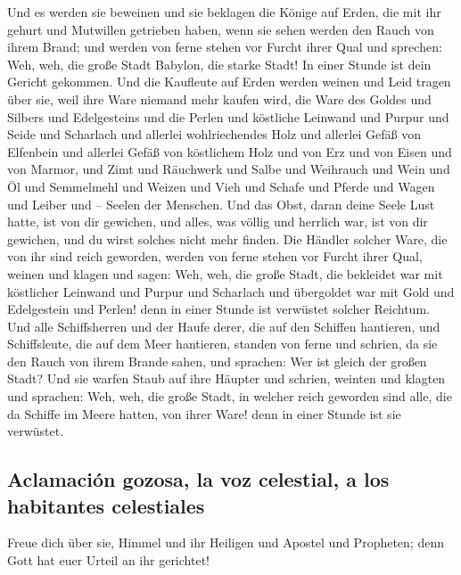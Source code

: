  Und es werden sie beweinen und sie beklagen die Könige
auf Erden, die mit ihr gehurt und Mutwillen getrieben haben, wenn sie
sehen werden den Rauch von ihrem Brand;  und werden von
ferne stehen vor Furcht ihrer Qual und sprechen: Weh, weh, die große
Stadt Babylon, die starke Stadt! In einer Stunde ist dein Gericht
gekommen.  Und die Kaufleute auf Erden werden weinen und
Leid tragen über sie, weil ihre Ware niemand mehr kaufen wird,
 die Ware des Goldes und Silbers und Edelgesteins und die
Perlen und köstliche Leinwand und Purpur und Seide und Scharlach und
allerlei wohlriechendes Holz und allerlei Gefäß von Elfenbein und
allerlei Gefäß von köstlichem Holz und von Erz und von Eisen und von
Marmor,  und Zimt und Räuchwerk und Salbe und Weihrauch
und Wein und Öl und Semmelmehl und Weizen und Vieh und Schafe und Pferde
und Wagen und Leiber und -- Seelen der Menschen.  Und das
Obst, daran deine Seele Lust hatte, ist von dir gewichen, und alles, was
völlig und herrlich war, ist von dir gewichen, und du wirst solches
nicht mehr finden.  Die Händler solcher Ware, die von ihr
sind reich geworden, werden von ferne stehen vor Furcht ihrer Qual,
weinen und klagen  und sagen: Weh, weh, die große Stadt,
die bekleidet war mit köstlicher Leinwand und Purpur und Scharlach und
übergoldet war mit Gold und Edelgestein und Perlen!  denn
in einer Stunde ist verwüstet solcher Reichtum. Und alle Schiffsherren
und der Haufe derer, die auf den Schiffen hantieren, und Schiffsleute,
die auf dem Meer hantieren, standen von ferne  und
schrien, da sie den Rauch von ihrem Brande sahen, und sprachen: Wer ist
gleich der großen Stadt?  Und sie warfen Staub auf ihre
Häupter und schrien, weinten und klagten und sprachen: Weh, weh, die
große Stadt, in welcher reich geworden sind alle, die da Schiffe im
Meere hatten, von ihrer Ware! denn in einer Stunde ist sie verwüstet.

\hypertarget{aclamaciuxf3n-gozosa-la-voz-celestial-a-los-habitantes-celestiales}{%
\subsection{Aclamación gozosa, la voz celestial, a los habitantes
celestiales}\label{aclamaciuxf3n-gozosa-la-voz-celestial-a-los-habitantes-celestiales}}

 Freue dich über sie, Himmel und ihr Heiligen und Apostel
und Propheten; denn Gott hat euer Urteil an ihr gerichtet!

